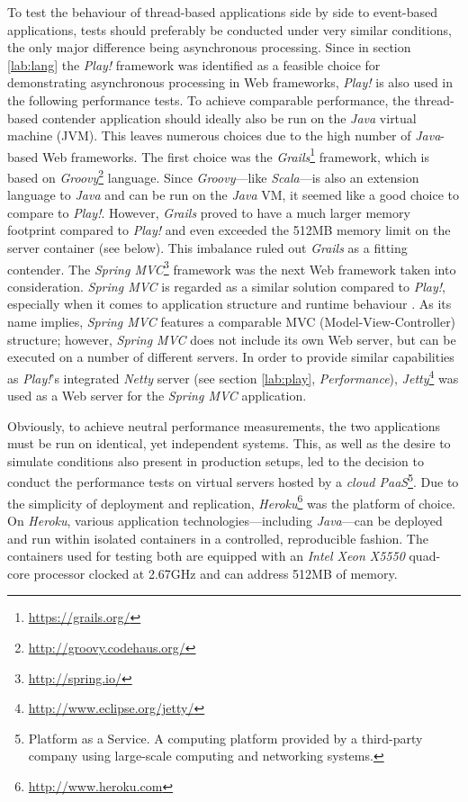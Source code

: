 To test the behaviour of thread-based applications side by side to event-based applications, tests should preferably be conducted under very similar conditions, the only major difference being asynchronous processing. Since in section \ref{lab:lang} the \textit{Play!} framework was identified as a feasible choice for demonstrating asynchronous processing in Web frameworks, \textit{Play!} is also used in the following performance tests. To achieve comparable performance, the thread-based contender application should ideally also be run on the \textit{Java} virtual machine (JVM). This leaves numerous choices due to the high number of \textit{Java}-based Web frameworks. The first choice was the \textit{Grails}\footnote{\url{https://grails.org/}} framework, which is based on \textit{Groovy}\footnote{\url{http://groovy.codehaus.org/}} language. Since \textit{Groovy}---like \textit{Scala}---is also an extension language to \textit{Java} and can be run on the \textit{Java} VM, it seemed like a good choice to compare to \textit{Play!}. However, \textit{Grails} proved to have a much larger memory footprint compared to \textit{Play!} and even exceeded the 512MB memory limit on the server container (see below). This imbalance ruled out \textit{Grails} as a fitting contender. The \textit{Spring MVC}\footnote{\url{http://spring.io/}} framework was the next Web framework taken into consideration. \textit{Spring MVC} is regarded as a similar solution compared to \textit{Play!}, especially when it comes to application structure and runtime behaviour \cite[p. 109]{Scala}. As its name implies, \textit{Spring MVC} features a comparable MVC (Model-View-Controller) structure; however, \textit{Spring MVC} does not include its own Web server, but can be executed on a number of different servers. In order to provide similar capabilities as \textit{Play!}'s integrated \textit{Netty} server (see section \ref{lab:play}, \textit{Performance}), \textit{Jetty}\footnote{\url{http://www.eclipse.org/jetty/}} was used as a Web server for the \textit{Spring MVC} application.

Obviously, to achieve neutral performance measurements, the two applications must be run on identical, yet independent systems. This, as well as the desire to simulate conditions also present in production setups, led to the decision to conduct the performance tests on virtual servers hosted by a \textit{cloud PaaS}\footnote{Platform as a Service. A computing platform provided by a third-party company using large-scale computing and networking systems.}. Due to the simplicity of deployment and replication, \textit{Heroku}\footnote{\url{http://www.heroku.com}} was the platform of choice. On \textit{Heroku}, various application technologies---including \textit{Java}---can be deployed and run within isolated containers in a controlled, reproducible fashion. The containers used for testing both are equipped with an \textit{Intel Xeon X5550} quad-core processor clocked at 2.67GHz and can address 512MB of memory.

